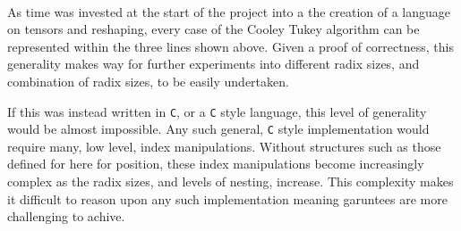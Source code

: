 \begin{AgdaSuppressSpace}
\begin{code}
\AgdaSymbol{(}\AgdaSpace{}%
\AgdaSpace{}%
\AgdaSymbol{)}\<%
\\
%
\>[6]%
\>[10]\AgdaSpace{}%
\AgdaSpace{}%
\<%
\end{code}
\begin{code}[hide]%
%
\>[6]\<%
\\
\>[6][@{}l@{\AgdaIndent{0}}]%
\>[8]\<%
\\
\>[8][@{}l@{\AgdaIndent{0}}]%
\>[10]\<%
\\
\>[10][@{}l@{\AgdaIndent{0}}]%
\>[12]\AgdaPostulate{\AgdaUnderscore{}}\AgdaSpace{}%
\AgdaSymbol{:}\AgdaSpace{}%
\AgdaSpace{}%
\<%
\\
%
\>[12]\AgdaPostulate{\AgdaUnderscore{}}\AgdaSpace{}%
\AgdaSymbol{:}\AgdaSpace{}%
\AgdaSpace{}%
\<%
\\
%
\>[12]\AgdaPostulate{\AgdaUnderscore{}}\AgdaSpace{}%
\AgdaSymbol{:}\AgdaSpace{}%
\AgdaSpace{}%
\AgdaSymbol{(}\AgdaSpace{}%
\AgdaSpace{}%
\AgdaSymbol{(}\AgdaSpace{}%
\AgdaSymbol{))}\<%
\end{code}
\end{AgdaSuppressSpace}

As time was invested at the start of the project into a the creation of a language 
on tensors and reshaping, every case of the Cooley Tukey algorithm can be 
represented within the three lines shown above. 
Given a proof of correctness, this generality makes way for further experiments 
into different radix sizes, and combination of radix sizes, to be easily undertaken.

If this was instead written in \verb|C|, or a \verb|C| style language, this level
of generality would be almost impossible.
Any such general, \verb|C| style implementation would require many, low level,
index manipulations.
Without structures such as those defined for here for position, these index manipulations 
become increasingly complex as the radix sizes, and levels of nesting, increase.
This complexity makes it difficult to reason upon any such implementation meaning
garuntees are more challenging to achive.






